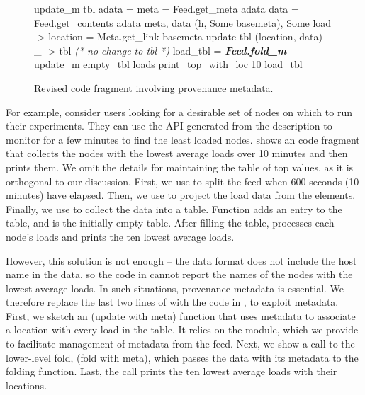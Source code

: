 \begin{figure}[tb]

\begin{codebox}
 update_m  tbl adata =
   meta = Feed.get_meta adata 
   data = Feed.get_contents adata 
   meta, data  
    (h, Some basemeta), Some load ->
       location = Meta.get_link basemeta 
      update tbl (location, data)
  | _ -> tbl \textit{ (* no change to tbl *)} 
 load_tbl = \textit{\textbf{Feed.fold_m}} update_m empty_tbl loads
 print_top_with_loc 10 load_tbl
\end{codebox}
  \caption{Revised code fragment involving provenance metadata. }
\label{fig:sample-loads-prov}
\end{figure}

For example, consider \planetlab users looking for a desirable set of
nodes on which to run their experiments. 
They can use the API generated from the \comon description 
to monitor \planetlab for a few
minutes to find the least loaded nodes. 
shows an \ocaml{} code fragment that collects the nodes with the
lowest average loads over 10 minutes and then prints them. 
We omit the details for maintaining the table of top values, as it is
orthogonal to our discussion. 
First, we use  to
split the feed when 600 seconds (10 minutes) have elapsed. Then, we
use  to project the load data from the \comon
elements. Finally, we use  to collect the data
into a table. Function  adds an entry to the table, and
 is the initially empty table.
After filling the table, 
processes each node's loads
and prints the ten lowest average loads.

However, this solution is not enough -- the \comon data format
does not include the host name in the data, so the code in
 cannot report the names of the nodes with the lowest
average loads.
In such situations, provenance metadata is essential. We therefore replace the last two lines of
 with the code in
, to exploit metadata. First, we sketch an 
 (update with meta) function that uses
metadata to associate a location with every load in the table. It relies on the  module, 
which we provide to facilitate management of metadata from the feed. Next, 
we show a call to the lower-level fold,  (fold with meta), which passes the 
data with its metadata to the folding
function.  Last, the call  prints the ten lowest average loads
with their locations.

